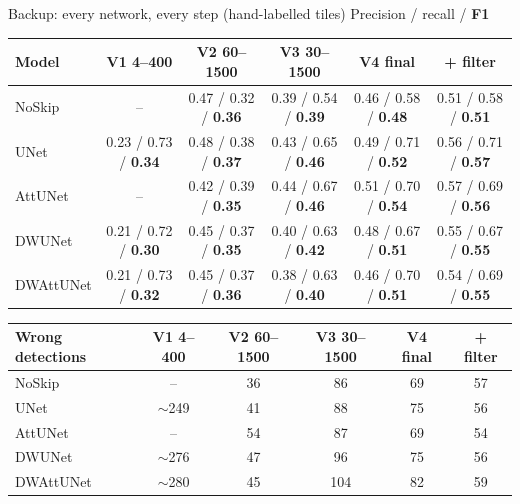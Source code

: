 \begin{frame}{Backup: every network, every step (hand-labelled tiles)}
  \centering\scriptsize
  \renewcommand{\arraystretch}{1.05}\setlength{\tabcolsep}{3.5pt}
  Precision / recall / \textbf{F1}\\[1mm]
\begin{tabular}{@{}lccccc@{}}
\toprule
\textbf{Model} & \textbf{V1 4--400} & \textbf{V2 60--1500} & \textbf{V3 30--1500} & \textbf{V4 final} & \textbf{+ filter} \\
\midrule
NoSkip & -- & 0.47 / 0.32 / \textbf{0.36} & 0.39 / 0.54 / \textbf{0.39} & 0.46 / 0.58 / \textbf{0.48} & 0.51 / 0.58 / \textbf{0.51} \\
UNet & 0.23 / 0.73 / \textbf{0.34} & 0.48 / 0.38 / \textbf{0.37} & 0.43 / 0.65 / \textbf{0.46} & 0.49 / 0.71 / \textbf{0.52} & 0.56 / 0.71 / \textbf{0.57} \\
AttUNet & -- & 0.42 / 0.39 / \textbf{0.35} & 0.44 / 0.67 / \textbf{0.46} & 0.51 / 0.70 / \textbf{0.54} & 0.57 / 0.69 / \textbf{0.56} \\
DWUNet & 0.21 / 0.72 / \textbf{0.30} & 0.45 / 0.37 / \textbf{0.35} & 0.40 / 0.63 / \textbf{0.42} & 0.48 / 0.67 / \textbf{0.51} & 0.55 / 0.67 / \textbf{0.55} \\
DWAttUNet & 0.21 / 0.73 / \textbf{0.32} & 0.45 / 0.37 / \textbf{0.36} & 0.38 / 0.63 / \textbf{0.40} & 0.46 / 0.70 / \textbf{0.51} & 0.54 / 0.69 / \textbf{0.55} \\
\bottomrule
\end{tabular}

  \vspace{3mm}
\begin{tabular}{@{}lccccc@{}}
\toprule
\textbf{Wrong detections} & \textbf{V1 4--400} & \textbf{V2 60--1500} & \textbf{V3 30--1500} & \textbf{V4 final} & \textbf{+ filter} \\
\midrule
NoSkip & -- & 36 & 86 & 69 & 57 \\
UNet & $\sim$249 & 41 & 88 & 75 & 56 \\
AttUNet & -- & 54 & 87 & 69 & 54 \\
DWUNet & $\sim$276 & 47 & 96 & 75 & 56 \\
DWAttUNet & $\sim$280 & 45 & 104 & 82 & 59 \\
\bottomrule
\end{tabular}
  \vfill
\end{frame}

